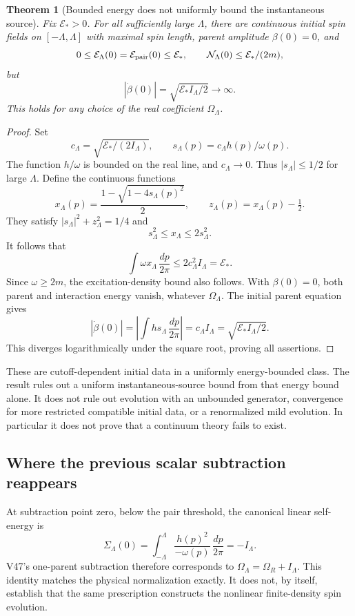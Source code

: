 \documentclass[11pt]{article}
\newtheorem{theorem}{Theorem}[section]
\theoremstyle{remark}
\begin{document}
\begin{theorem}[Bounded energy does not uniformly bound the instantaneous source]
\label{thm:v20v64-source}
Fix \(\mathcal E_*>0\).  For all sufficiently large
\(\Lambda\), there are continuous initial spin fields
on \([-\Lambda,\Lambda]\) with maximal spin length,
parent amplitude \(\beta(0)=0\), and
\[
 0\leq\mathcal E_\Lambda(0)=\mathcal E_{\rm pair}(0)
          \leq\mathcal E_*,
 \qquad
 \mathcal N_\Lambda(0)\leq\mathcal E_*/(2m),
\]
but
\[
 |\dot\beta(0)|=\sqrt{\mathcal E_* I_\Lambda/2}
                                      \longrightarrow\infty .
\]
This holds for any choice of the real coefficient
\(\Omega_\Lambda\).
\end{theorem}
\begin{proof}
Set
\[
 c_\Lambda=\sqrt{\mathcal E_*/(2I_\Lambda)},\qquad
 s_\Lambda(p)=c_\Lambda h(p)/\omega(p).
\]
The function \(h/\omega\) is bounded on the real line,
and \(c_\Lambda\to0\).  Thus \(|s_\Lambda|\leq1/2\)
for large \(\Lambda\).  Define the continuous functions
\[
 x_\Lambda(p)=
       \frac{1-\sqrt{1-4s_\Lambda(p)^2}}2,\qquad
 z_\Lambda(p)=x_\Lambda(p)-\tfrac12 .
\]
They satisfy
\(|s_\Lambda|^2+z_\Lambda^2=1/4\) and
\[
 s_\Lambda^2\leq x_\Lambda\leq2s_\Lambda^2.
\]
It follows that
\[
 \int\omega x_\Lambda\,\frac{dp}{2\pi}
    \leq2c_\Lambda^2 I_\Lambda=\mathcal E_* .
\]
Since \(\omega\geq2m\), the excitation-density bound
also follows.  With \(\beta(0)=0\), both parent and
interaction energy vanish, whatever \(\Omega_\Lambda\).
The initial parent equation gives
\[
 |\dot\beta(0)|=
 \left|\int h s_\Lambda\,\frac{dp}{2\pi}\right|
      =c_\Lambda I_\Lambda
      =\sqrt{\mathcal E_*I_\Lambda/2}.
\]
This diverges logarithmically under the square root,
proving all assertions.
\end{proof}

These are cutoff-dependent initial data in a uniformly
energy-bounded class.  The result rules out a uniform
instantaneous-source bound from that energy bound alone.
It does not rule out evolution with an unbounded generator,
convergence for more restricted compatible initial data,
or a renormalized mild evolution.  In particular it
does not prove that a continuum theory fails to exist.

\subsection{Where the previous scalar subtraction reappears}

At subtraction point zero, below the pair threshold,
the canonical linear self-energy is
\[
 \Sigma_\Lambda(0)=
     \int_{-\Lambda}^{\Lambda}
       \frac{h(p)^2}{-\omega(p)}\,\frac{dp}{2\pi}
                       =-I_\Lambda .
\]
V47's one-parent subtraction therefore corresponds to
\(\Omega_\Lambda=\Omega_R+I_\Lambda\).
This identity matches the physical normalization exactly.
It does not, by itself, establish that the same prescription
constructs the nonlinear finite-density spin evolution.
\end{document}
